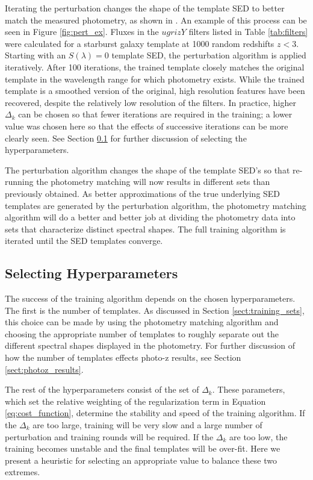 Iterating the perturbation changes the shape of the template SED to better match the measured photometry, as shown in \citet{Budavari2000b}. 
An example of this process can be seen in Figure \ref{fig:pert_ex}. 
Fluxes in the $ugrizY$ filters listed in Table \ref{tab:filters} were calculated for a starburst galaxy template at 1000 random redshifts $z < 3$. 
Starting with an $S(\lambda) = 0$ template SED, the perturbation algorithm is applied iteratively. 
After 100 iterations, the trained template closely matches the original template in the wavelength range for which photometry exists. 
While the trained template is a smoothed version of the original, high resolution features have been recovered, despite the relatively low resolution of the filters. 
In practice, higher $\Delta_k$ can be chosen so that fewer iterations are required in the training; a lower value was chosen here so that the effects of successive iterations can be more clearly seen.
See Section \ref{sect:hyperparameters} for further discussion of selecting the hyperparameters.

The perturbation algorithm changes the shape of the template SED's so that re-running the photometry matching will now results in different sets than previously obtained.
As better approximations of the true underlying SED templates are generated by the perturbation algorithm, the photometry matching algorithm will do a better and better job at dividing the photometry data into sets that characterize distinct spectral shapes. 
The full training algorithm is iterated until the SED templates converge.




\subsection{Selecting Hyperparameters}
\label{sect:hyperparameters}

The success of the training algorithm depends on the chosen hyperparameters.
The first is the number of templates. 
As discussed in Section \ref{sect:training_sets}, this choice can be made by using the photometry matching algorithm and choosing the appropriate number of templates to roughly separate out the different spectral shapes displayed in the photometry.
For further discussion of how the number of templates effects photo-z results, see Section \ref{sect:photoz_results}.

The rest of the hyperparameters consist of the set of $\Delta_k$.
These parameters, which set the relative weighting of the regularization term in Equation \ref{eq:cost_function}, determine the stability and speed of the training algorithm.
If the $\Delta_k$ are too large, training will be very slow and a large number of perturbation and training rounds will be required. 
If the $\Delta_k$ are too low, the training becomes unstable and the final templates will be over-fit.
Here we present a heuristic for selecting an appropriate value to balance these two extremes.

